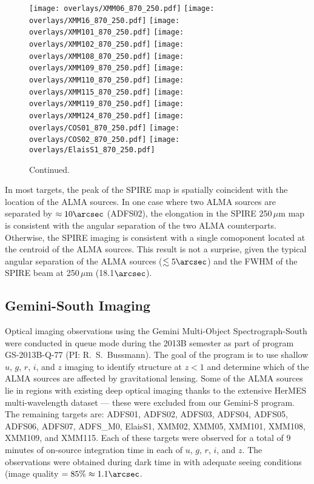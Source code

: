 \documentclass[iop]{emulateapj}
\begin{document}
\begin{figure*}[!tbp] 
    \begin{centering}
\texttt{[image: overlays/XMM06\_870\_250.pdf]}
\texttt{[image: overlays/XMM16\_870\_250.pdf]}
\texttt{[image: overlays/XMM101\_870\_250.pdf]}
\texttt{[image: overlays/XMM102\_870\_250.pdf]}
\texttt{[image: overlays/XMM108\_870\_250.pdf]}
\texttt{[image: overlays/XMM109\_870\_250.pdf]}
\texttt{[image: overlays/XMM110\_870\_250.pdf]}
\texttt{[image: overlays/XMM115\_870\_250.pdf]}
\texttt{[image: overlays/XMM119\_870\_250.pdf]}
\texttt{[image: overlays/XMM124\_870\_250.pdf]}
\texttt{[image: overlays/COS01\_870\_250.pdf]}
\texttt{[image: overlays/COS02\_870\_250.pdf]}
\texttt{[image: overlays/ElaisS1\_870\_250.pdf]}
\end{centering}

\caption{ Continued.}

\end{figure*}

In most targets, the peak of the SPIRE map is spatially coincident with the
location of the ALMA sources.  In one case where two ALMA sources are separated
by $\approx 10\arcsec$ (ADFS02), the elongation in the SPIRE 250$\,\mu$m map is
consistent with the angular separation of the two ALMA counterparts.
Otherwise, the SPIRE imaging is consistent with a single comoponent located at
the centroid of the ALMA sources.  This result is not a surprise, given the
typical angular separation of the ALMA sources ($\lesssim 5\arcsec$) and the
FWHM of the SPIRE beam at 250$\,\mu$m (18.1$\arcsec$). 

\subsection{Gemini-South Imaging}\label{sec:geminiobs}

Optical imaging observations using the Gemini Multi-Object Spectrograph-South
\citep[GMOS-S;][]{Hook:2004qy} were conducted in queue mode during the 2013B
semester as part of program GS-2013B-Q-77 (PI: R.~S.~Bussmann).  The goal of
the program is to use shallow $u$, $g$, $r$, $i$, and $z$ imaging to identify
structure at $z<1$ and determine which of the ALMA sources are affected by
gravitational lensing.  Some of the ALMA sources lie in regions with existing
deep optical imaging thanks to the extensive HerMES multi-wavelength dataset
--- these were excluded from our Gemini-S program.  The remaining targets are:
ADFS01, ADFS02, ADFS03, ADFS04, ADFS05, ADFS06, ADFS07, ADFS\_M0, ElaisS1,
XMM02, XMM05, XMM101, XMM108, XMM109, and XMM115.  Each of these targets were
observed for a total of 9$\,$minutes of on-source integration time in each of
$u$, $g$, $r$, $i$, and $z$.  The observations were obtained during dark time
in with adequate seeing conditions (image quality $ = 85\% \approx 1.1\arcsec$.
\end{document}
